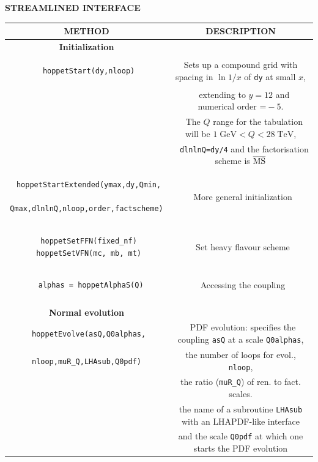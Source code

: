 \documentclass[12pt]{article}
\newcommand{\GeV}{\;\mathrm{GeV}}
\newcommand{\TeV}{\;\mathrm{TeV}}
\newcommand{\ttt}[1]{\texttt{#1}}
\newcommand{\fn}{\scriptsize}
\begin{document}
\begin{table}
\begin{center}
{\bf \large STREAMLINED INTERFACE}
\\
\vspace{0.2cm}
\begin{tabular}{|c|c|}
\hline
\bf METHOD  & \bf DESCRIPTION \\
\hline
\bf Initialization & \\
\hline
\begin{lstlisting}
 hoppetStart(dy,nloop)
\end{lstlisting} 
& \scriptsize
Sets up a compound grid with
spacing in $\ln 1/x$ of \ttt{dy} at small $x$,\\ &
\fn~  extending to $y = 12$ and numerical
order $\ttt=-5$. \\ & \fn~  The $Q$ range for the tabulation will be $1\GeV <
Q<28 \TeV$, \\
& \fn~ \ttt{dlnlnQ=dy/4} and the factorisation scheme is ${\overline{\rm MS}}$\\
\hline
\begin{lstlisting}
 hoppetStartExtended(ymax,dy,Qmin,
 Qmax,dlnlnQ,nloop,order,factscheme)
\end{lstlisting} & \fn
  ~More general initialization \\
\hline 
\begin{lstlisting}
 hoppetSetFFN(fixed_nf)
 hoppetSetVFN(mc, mb, mt)
\end{lstlisting} &
\fn ~Set heavy flavour scheme
\\
\hline
\begin{lstlisting}
  alphas = hoppetAlphaS(Q)
\end{lstlisting} &
\fn~Accessing the coupling \\
\hline&\\[-0.5em]
\bf Normal evolution & \\
\hline
\texttt{\footnotesize
 hoppetEvolve(asQ,Q0alphas,}
& \fn\ PDF evolution: specifies the coupling \ttt{asQ} at a 
scale \ttt{Q0alphas}, \\
 \texttt{\footnotesize nloop,muR\_Q,LHAsub,Q0pdf)}&
 \fn the number of loops for  evol., \ttt{nloop}, \\
&\fn the ratio (\ttt{muR\_Q}) of ren. to fact. scales. \\ 
&  \fn the name of a subroutine \ttt{LHAsub} with an LHAPDF-like interface \\
&  \fn and the scale
\ttt{Q0pdf} at which one starts the PDF evolution \\

\end{tabular}
\end{center}
\end{table}
\end{document}
